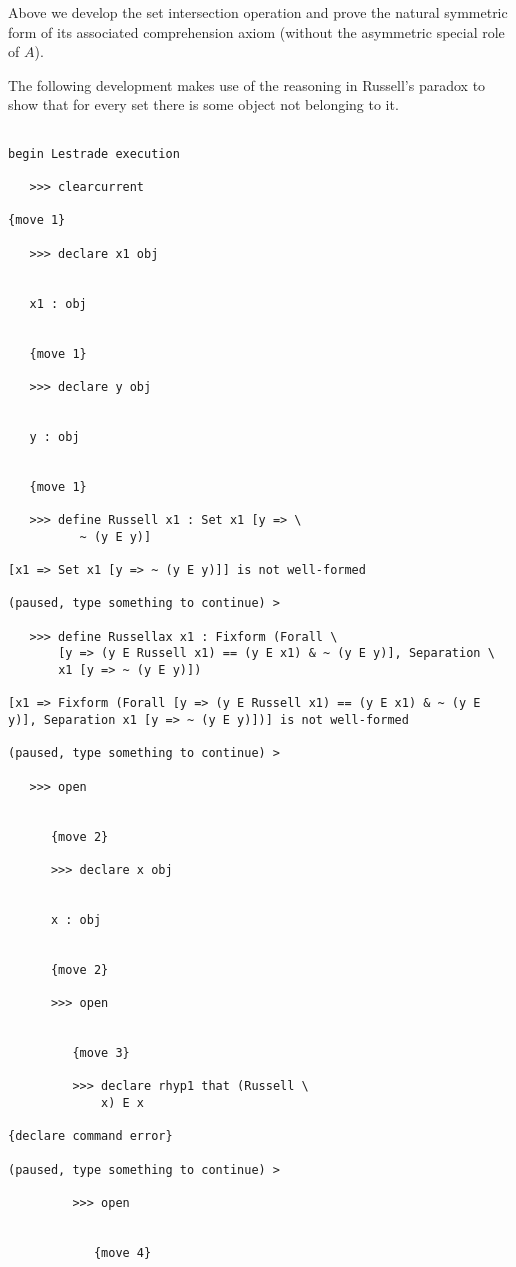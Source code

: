 \documentclass[12pt]{article}
\begin{document}
Above we develop the set intersection operation and prove the natural symmetric form of its associated comprehension axiom (without the asymmetric special role of $A$).


The following development makes use of the reasoning in Russell's paradox to show that for every set there is some object not belonging to it.

\begin{verbatim}

begin Lestrade execution

   >>> clearcurrent

{move 1}

   >>> declare x1 obj


   x1 : obj


   {move 1}

   >>> declare y obj


   y : obj


   {move 1}

   >>> define Russell x1 : Set x1 [y => \
          ~ (y E y)]

[x1 => Set x1 [y => ~ (y E y)]] is not well-formed

(paused, type something to continue) >

   >>> define Russellax x1 : Fixform (Forall \
       [y => (y E Russell x1) == (y E x1) & ~ (y E y)], Separation \
       x1 [y => ~ (y E y)])

[x1 => Fixform (Forall [y => (y E Russell x1) == (y E x1) & ~ (y E y)], Separation x1 [y => ~ (y E y)])] is not well-formed

(paused, type something to continue) >

   >>> open


      {move 2}

      >>> declare x obj


      x : obj


      {move 2}

      >>> open


         {move 3}

         >>> declare rhyp1 that (Russell \
             x) E x

{declare command error}

(paused, type something to continue) >

         >>> open


            {move 4}


\end{verbatim}
\end{document}
